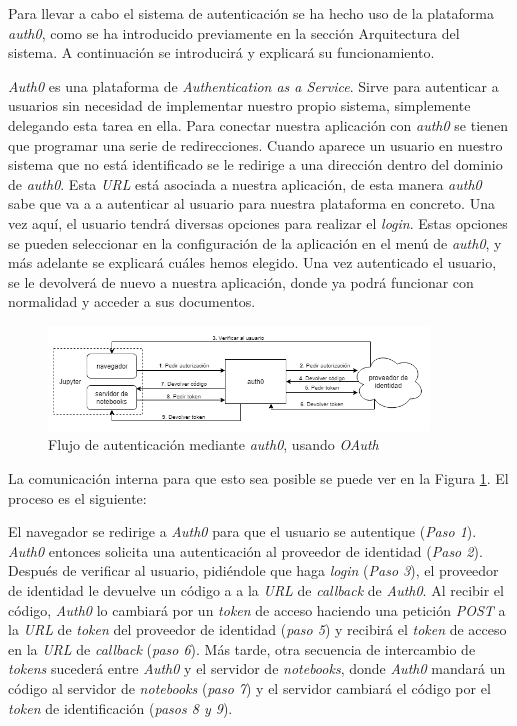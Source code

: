 \documentclass[11pt,spanish,listoffigures]{tfgetsinf}
\begin{document}
Para llevar a cabo el sistema de autenticación se ha hecho uso de la plataforma \textit{auth0}, como se ha introducido previamente en la sección Arquitectura del sistema. A continuación se introducirá y explicará su funcionamiento.

\textit{Auth0} es una plataforma de \textit{Authentication as a Service}. Sirve para autenticar a usuarios sin necesidad de implementar nuestro propio sistema, simplemente delegando esta tarea en ella. Para conectar nuestra aplicación con \textit{auth0} se tienen que programar una serie de redirecciones. Cuando aparece un usuario en nuestro sistema que no está identificado se le redirige a una dirección dentro del dominio de \textit{auth0}. Esta \textit{URL} está asociada a nuestra aplicación, de esta manera \textit{auth0} sabe que va a a autenticar al usuario para nuestra plataforma en concreto. Una vez aquí, el usuario tendrá diversas opciones para realizar el \textit{login}. Estas opciones se pueden seleccionar en la configuración de la aplicación en el menú de \textit{auth0}, y más adelante se explicará cuáles hemos elegido. Una vez autenticado el usuario, se le devolverá de nuevo a nuestra aplicación, donde ya podrá funcionar con normalidad y acceder a sus documentos.

\begin{figure}[h]
	\centering
  	\includegraphics[width=0.9\textwidth]{auth0-flow.png}
  	\caption{Flujo de autenticación mediante \textit{auth0}, usando \textit{OAuth}}
  	\label{fig:auth0-scheme}
\end{figure}

La comunicación interna para que esto sea posible se puede ver en la Figura \ref{fig:auth0-scheme}. El proceso es el siguiente: 

El navegador se redirige a \textit{Auth0} para que el usuario se autentique (\textit{Paso 1}). \textit{Auth0} entonces solicita una autenticación al proveedor de identidad (\textit{Paso 2}). Después de verificar al usuario, pidiéndole que haga \textit{login} (\textit{Paso 3}), el proveedor de identidad le devuelve un código a a la \textit{URL} de \textit{\gls{callback}} de \textit{Auth0}. Al recibir el código, \textit{Auth0} lo cambiará por un \textit{token} de acceso haciendo una petición \textit{POST} a la \textit{URL} de \textit{token} del proveedor de identidad (\textit{paso 5}) y recibirá el \textit{token} de acceso en la \textit{URL} de \textit{callback} (\textit{paso 6}). Más tarde, otra secuencia de intercambio de \textit{tokens} sucederá entre \textit{Auth0} y el servidor de \textit{notebooks}, donde \textit{Auth0} mandará un código al servidor de \textit{notebooks} (\textit{paso 7}) y el servidor cambiará el código por el \textit{token} de identificación (\textit{pasos 8 y 9}).
\end{document}
